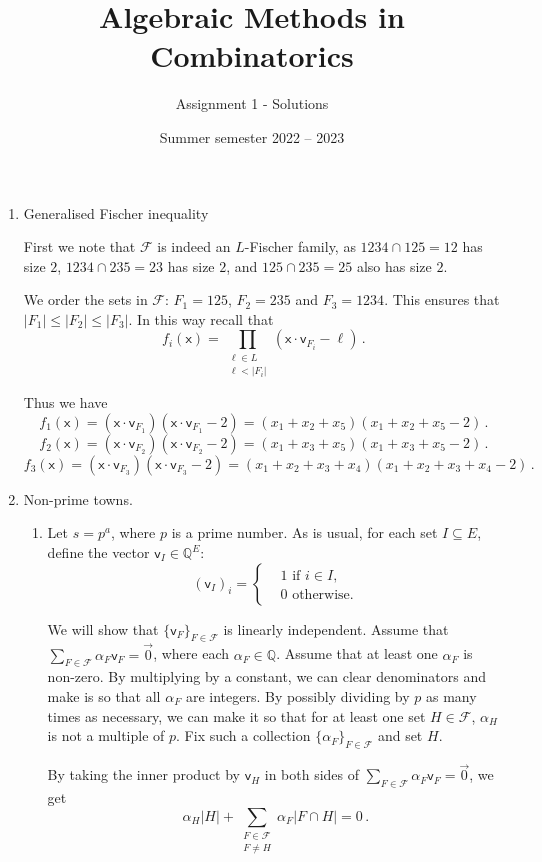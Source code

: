 \documentclass[kulak]{tplt}
\title{Algebraic Methods in Combinatorics}
\author{Assignment 1 - Solutions}
\date{Summer semester 2022 -- 2023}
\theoremstyle{definition}
\newcommand{\Q}{\mathbb{Q}}
\newcommand{\FF}{\mathcal F}
\newcommand{\vv}{\mathsf{v}}
\newcommand{\vx}{\mathsf{x}}
\begin{document}
\maketitle
\begin{enumerate}
\item Generalised Fischer inequality

First we note that $\FF $ is indeed an $L$-Fischer family, as $1234 \cap 125 = 12 $ has size $2$, $1234 \cap 235 = 23 $ has size $2$, and $125 \cap 235 = 25 $ also has size $2$.

We order the sets in $\FF $: $F_1 = 125$, $F_2 = 235$ and $F_3 = 1234$.
This ensures that $|F_1 | \leq |F_2| \leq |F_3|$.
In this way recall that
$$f_i (\vx) = \prod_{\substack{\ell \in L \\ \ell < |F_i|}} (\vx \cdot \vv_{F_i} - \ell ) \, . $$

Thus we have 
$$f_1(\vx) = ( \vx \cdot \vv_{F_1} ) (\vx \cdot \vv_{F_1} - 2 ) = (x_1 + x_2 + x_5 ) (x_1 + x_2 + x_5 - 2) \,  . $$
$$f_2(\vx) = ( \vx \cdot \vv_{F_2} ) (\vx \cdot \vv_{F_2} - 2 ) = (x_1 + x_3 + x_5 ) (x_1 + x_3 + x_5 - 2) \,  . $$
$$f_3(\vx) = ( \vx \cdot \vv_{F_3} ) (\vx \cdot \vv_{F_3} - 2 ) = (x_1 + x_2 + x_3 + x_4 ) (x_1 + x_2 + x_3 + x_4 - 2) \,  . $$


\item Non-prime towns.

\begin{enumerate}
\item 
Let $s = p^a$, where $p$ is a prime number.
As is usual, for each set $I \subseteq E$, define the vector $\vv_I \in \Q^E$:
$$ (\vv_I)_i =\begin{cases*}
      & 1 \text{ if $i \in I$,}\\
      & 0 \text{ otherwise.}
    \end{cases*} $$

We will show that $\{\vv_F\}_{F\in \FF}$ is linearly independent.
Assume that $\sum_{F \in \FF} \alpha_F \vv_F = \vec{0}$, where each $\alpha_F \in \Q$.
Assume that at least one $\alpha_F$ is non-zero.
By multiplying by a constant, we can clear denominators and make is so that all $\alpha_F$ are integers.
By possibly dividing by $p$ as many times as necessary, we can make it so that for at least one set $H\in \FF$, $\alpha_H$ is not a multiple of $p$.
Fix such a collection $\{\alpha_F\}_{F \in \FF}$ and set $H$.

By taking the inner product by $\vv_H$ in both sides of $\sum_{F \in \FF} \alpha_F \vv_F = \vec{0}$, we get
$$\alpha_H |H| + \sum_{\substack{F \in \FF\\ F \neq H}} \alpha_F |F \cap H| =  0  \, .$$


\end{enumerate}
\end{enumerate}
\end{document}
